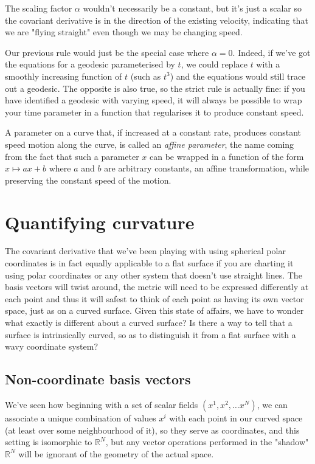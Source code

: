 The scaling factor $\alpha$ wouldn't necessarily be a constant, but it's just a scalar so the covariant derivative is in the direction of the existing velocity, indicating that we are "flying straight" even though we may be changing speed.

Our previous rule would just be the special case where $\alpha = 0$. Indeed, if we've got the equations for a geodesic parameterised by $t$, we could replace $t$ with a smoothly increasing function of $t$ (such as $t^3$) and the equations would still trace out a geodesic. The opposite is also true, so the strict rule is actually fine: if you have identified a geodesic with varying speed, it will always be possible to wrap your time parameter in a function that regularises it to produce constant speed.

A parameter on a curve that, if increased at a constant rate, produces constant speed motion along the curve, is called an \textit{affine parameter}, the name coming from the fact that such a parameter $x$ can be wrapped in a function of the form $x \mapsto ax + b$ where $a$ and $b$ are arbitrary constants, an affine transformation, while preserving the constant speed of the motion.

\section{Quantifying curvature}

The covariant derivative that we've been playing with using spherical polar coordinates is in fact equally applicable to a flat surface if you are charting it using polar coordinates or any other system that doesn't use straight lines. The basis vectors will twist around, the metric will need to be expressed differently at each point and thus it will safest to think of each point as having its own vector space, just as on a curved surface. Given this state of affairs, we have to wonder what exactly is different about a curved surface? Is there a way to tell that a surface is intrinsically curved, so as to distinguish it from a flat surface with a wavy coordinate system?

\subsection{Non-coordinate basis vectors}

We've seen how beginning with a set of scalar fields $(x^1, x^2, \dots x^N)$, we can associate a unique combination of values $x^i$ with each point in our curved space (at least over some neighbourhood of it), so they serve as coordinates, and this setting is isomorphic to $\mathbb{R}^N$, but any vector operations performed in the "shadow" $\mathbb{R}^N$ will be ignorant of the geometry of the actual space.

